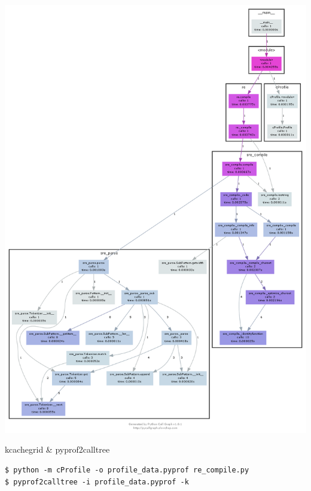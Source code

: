 \documentclass{article}
\begin{document}
\includegraphics[scale=0.3]{images/re_compile_callgraph.png}
\newpage

\begin{center}kcachegrid \& pyprof2calltree\end{center}
\begin{verbatim}
$ python -m cProfile -o profile_data.pyprof re_compile.py
$ pyprof2calltree -i profile_data.pyprof -k
\end{verbatim}
\end{document}
